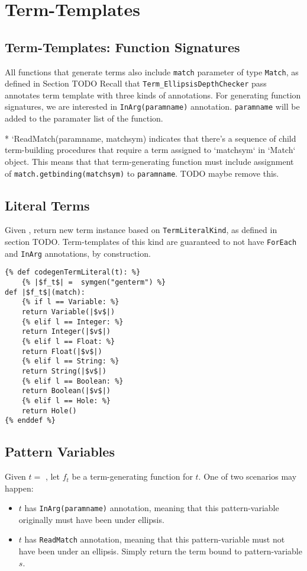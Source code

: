 \section{Term-Templates}

\subsection{Term-Templates: Function Signatures}
All functions that generate terms also include \texttt{match} parameter of type \texttt{Match}, as defined in Section TODO
Recall that \texttt{Term\_EllipsisDepthChecker} pass annotates term template with three kinds of annotations. For generating function signatures, we are interested in \texttt{InArg(paramname)} annotation. \texttt{paramname} will be added to the paramater list of the function. 


* `ReadMatch(paramname, matchsym) indicates that there's a sequence of child term-building procedures that require a term assigned to `matchsym` in `Match` object. This means that that term-generating function must include assignment of \texttt{match.getbinding(matchsym)} to \texttt{paramname}.
TODO maybe remove this.


\subsection{Literal Terms}

Given \TermLiteral, return new term instance based on \texttt{TermLiteralKind}, as defined in section TODO. Term-templates of this kind are guaranteed to not have \texttt{ForEach} and \texttt{InArg} annotations, by construction.

\begin{verbatim}
{% def codegenTermLiteral(t): %}
	{% |$f_t$| =  symgen("genterm") %}
def |$f_t$|(match):
	{% if l == Variable: %}
	return Variable(|$v$|)
	{% elif l == Integer: %}
	return Integer(|$v$|)
	{% elif l == Float: %}
	return Float(|$v$|)
	{% elif l == String: %}
	return String(|$v$|)
	{% elif l == Boolean: %}
	return Boolean(|$v$|)
	{% elif l == Hole: %}
	return Hole()
{% enddef %}
\end{verbatim}


\subsection{Pattern Variables}

Given $t =$ \PatternVariable, let $f_t$ be a term-generating function for $t$. One of two scenarios may happen:
\begin{itemize}
\item $t$ has \texttt{InArg(paramname)} annotation, meaning that this pattern-variable originally must have been under ellipsis. 
\item $t$ has \texttt{ReadMatch} annotation, meaning that this pattern-variable must not have been under an ellipsis. Simply return the term bound to pattern-variable $s$.
\end{itemize}

